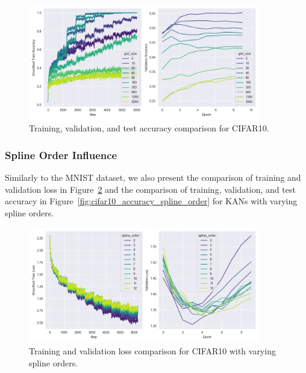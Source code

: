 \documentclass{article}
\begin{document}
\begin{figure}[H]
    \centering
    \includegraphics[width=0.9\textwidth]{pics/cifar10_accuracy_grid_size}
    \caption{Training, validation, and test accuracy comparison for CIFAR10.}
    \label{fig:cifar10_accuracy_grid_size}
\end{figure}


\subsubsection{Spline Order Influence}\label{subsubsec:spline-order-influence-cifar10}

Similarly to the MNIST dataset, we also present the comparison of training and validation loss in Figure~\ref{fig:cifar10_loss_spline_order}
and the comparison of training, validation, and test accuracy in Figure~\ref{fig:cifar10_accuracy_spline_order} for KANs with varying spline orders.

\begin{figure}[H]
    \centering
    \includegraphics[width=0.9\textwidth]{pics/cifar10_loss_spline_order}
    \caption{Training and validation loss comparison for CIFAR10 with varying spline orders.}
    \label{fig:cifar10_loss_spline_order}
\end{figure}
\end{document}
